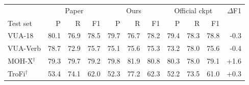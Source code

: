 \begin{tabular}{lrrrrrrrrrr}
\toprule
& \multicolumn{3}{c}{Paper} & \multicolumn{3}{c}{Ours} & \multicolumn{3}{c}{Official ckpt} & $\Delta$F1 \\
Test set & P & R & F1 & P & R & F1 & P & R & F1 & \\
\midrule
VUA-18 & 80.1 & 76.9 & 78.5 & 79.7 & 76.7 & 78.2 & 79.4 & 78.3 & 78.8 & -0.3 \\
VUA-Verb & 78.7 & 72.9 & 75.7 & 75.1 & 75.6 & 75.3 & 73.2 & 78.0 & 75.6 & -0.4 \\
MOH-X$^\dagger$ & 79.3 & 79.7 & 79.2 & 79.8 & 81.9 & 80.8 & 80.3 & 78.0 & 79.1 & +1.6 \\
TroFi$^\dagger$ & 53.4 & 74.1 & 62.0 & 52.3 & 77.2 & 62.3 & 52.2 & 73.5 & 61.0 & +0.3 \\
\bottomrule
\end{tabular}
